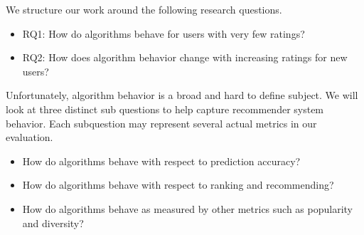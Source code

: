 \documentclass[letterpaper]{sig-alternate}
\begin{document}

  We structure our work around the following research questions.
  \begin{itemize}
    \item RQ1: How do algorithms behave for users with very few ratings?
    \item RQ2: How does algorithm behavior change with increasing ratings for new users?
  \end{itemize}
  Unfortunately, algorithm behavior is a broad and hard to define subject.
  We will look at three distinct sub questions to help capture recommender system behavior.
  Each subquestion may represent several actual metrics in our evaluation.

      
  \begin{itemize}
  \item How do algorithms behave with respect to prediction accuracy?
  \item How do algorithms behave with respect to ranking and recommending?
  \item How do algorithms behave as measured by other metrics such as popularity and diversity?
  \end{itemize}
\end{document}
